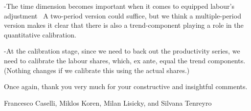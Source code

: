 \documentclass[12pt]{article}
\begin{document}
-The time dimension becomes important when it comes to equipped labour's
adjustment \ A two-period version could suffice, but we think a
multiple-period version makes it clear that there is also a trend-component
playing a role in the quantitative calibration.

-At the calibration stage, since we need to back out the productivity
series, we need to calibrate the labour shares, which, ex ante, equal the
trend components. (Nothing changes if we calibrate this using the actual
shares.)

\medskip \medskip \bigskip

Once again, thank you very much for your constructive and insightful
comments.

Francesco Caselli, Miklos Koren, Milan Lisicky, and Silvana Tenreyro
\end{document}
